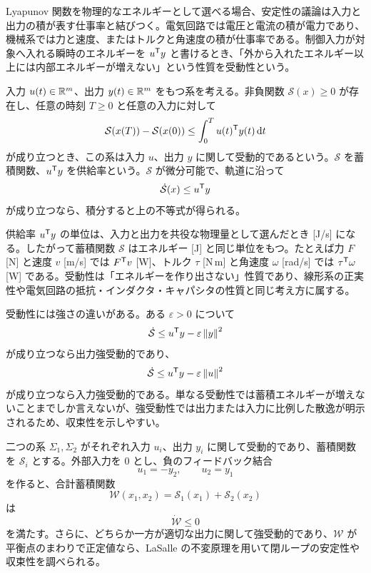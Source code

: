 Lyapunov 関数を物理的なエネルギーとして選べる場合、安定性の議論は入力と出力の積が表す仕事率と結びつく。電気回路では電圧と電流の積が電力であり、機械系では力と速度、またはトルクと角速度の積が仕事率である。制御入力が対象へ入れる瞬時のエネルギーを $u^{\mathsf{T}} y$ と書けるとき、「外から入れたエネルギー以上には内部エネルギーが増えない」という性質を受動性という。

\begin{definition}
入力 $u(t)\in\mathbb{R}^m$、出力 $y(t)\in\mathbb{R}^m$ をもつ系を考える。非負関数 $\mathcal{S}(x)\ge0$ が存在し、任意の時刻 $T\ge0$ と任意の入力に対して
\begin{equation}
  \mathcal{S}(x(T))-\mathcal{S}(x(0))
  \le
  \int_0^T u(t)^{\mathsf{T}} y(t)\,\mathrm{d} t
\end{equation}
が成り立つとき、この系は入力 $u$、出力 $y$ に関して受動的であるという。$\mathcal{S}$ を蓄積関数、$u^{\mathsf{T}} y$ を供給率という。$\mathcal{S}$ が微分可能で、軌道に沿って
\begin{equation}
  \dot{\mathcal{S}}(x)\le u^{\mathsf{T}} y
\end{equation}
が成り立つなら、積分すると上の不等式が得られる。
\end{definition}

供給率 $u^{\mathsf{T}} y$ の単位は、入力と出力を共役な物理量として選んだとき [J/s] になる。したがって蓄積関数 $\mathcal{S}$ はエネルギー [J] と同じ単位をもつ。たとえば力 $F$ [N] と速度 $v$ [m/s] では $F^{\mathsf{T}} v$ [W]、トルク $\tau$ [N\,m] と角速度 $\omega$ [rad/s] では $\tau^{\mathsf{T}} \omega$ [W] である。受動性は「エネルギーを作り出さない」性質であり、線形系の正実性や電気回路の抵抗・インダクタ・キャパシタの性質と同じ考え方に属する。

受動性には強さの違いがある。ある $\varepsilon>0$ について
\begin{equation}
  \dot{\mathcal{S}}\le u^{\mathsf{T}} y-\varepsilon\left\|y\right\|^2
\end{equation}
が成り立つなら出力強受動的であり、
\begin{equation}
  \dot{\mathcal{S}}\le u^{\mathsf{T}} y-\varepsilon\left\|u\right\|^2
\end{equation}
が成り立つなら入力強受動的である。単なる受動性では蓄積エネルギーが増えないことまでしか言えないが、強受動性では出力または入力に比例した散逸が明示されるため、収束性を示しやすい。

\begin{theorem}[受動性定理の基本形]
二つの系 $\Sigma_1,\Sigma_2$ がそれぞれ入力 $u_i$、出力 $y_i$ に関して受動的であり、蓄積関数を $\mathcal{S}_i$ とする。外部入力を 0 とし、負のフィードバック結合
\begin{equation}
  u_1=-y_2,\qquad u_2=y_1
\end{equation}
を作ると、合計蓄積関数
\begin{equation}
  \mathcal{W}(x_1,x_2)=\mathcal{S}_1(x_1)+\mathcal{S}_2(x_2)
\end{equation}
は
\begin{equation}
  \dot{\mathcal{W}}\le0
\end{equation}
を満たす。さらに、どちらか一方が適切な出力に関して強受動的であり、$\mathcal{W}$ が平衡点のまわりで正定値なら、LaSalle の不変原理を用いて閉ループの安定性や収束性を調べられる。
\end{theorem}

